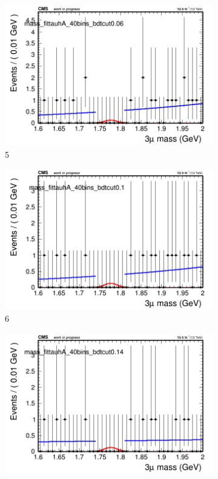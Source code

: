 \begin{figure}[h!]
\begin{subfigure}{0.2\textwidth}
        \includegraphics[width=\textwidth]{unfixed_exp/plots/tauhA/massfit_tauhA_40bins_bdtcut0.06.png}
        \caption{5}
    \end{subfigure}
    \begin{subfigure}{0.2\textwidth}
        \includegraphics[width=\textwidth]{unfixed_exp/plots/tauhA/massfit_tauhA_40bins_bdtcut0.1.png}
        \caption{6}
    \end{subfigure}
    \begin{subfigure}{0.2\textwidth}
        \includegraphics[width=\textwidth]{unfixed_exp/plots/tauhA/massfit_tauhA_40bins_bdtcut0.14.png}

\end{subfigure}
\end{figure}
